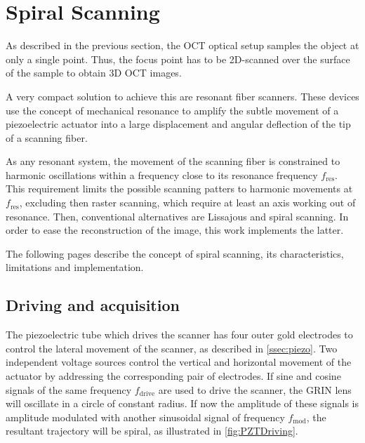 \documentclass[10pt]{iopart}
\begin{document}
\section{Spiral Scanning}


As described in the previous section, the OCT optical setup samples the object at only a single point. Thus, the focus point has to be 2D-scanned over the surface of the sample to obtain 3D OCT images.

A very compact solution to achieve this are resonant fiber scanners. These devices use the concept of mechanical resonance to amplify the subtle movement of a piezoelectric actuator into a large displacement and angular deflection of the tip of a scanning fiber. 

As any resonant system, the movement of the scanning fiber is constrained to harmonic oscillations within a frequency close to its resonance frequency $f_\mathrm{res}$. This requirement limits the possible scanning patters to harmonic movements at $f_\mathrm{res}$, excluding then raster scanning, which require at least an axis working out of resonance. Then, conventional alternatives are Lissajous \cite{Moon2010} and spiral scanning. In order to ease the reconstruction of the image, this work implements the latter.

The following pages describe the concept of spiral scanning, its characteristics, limitations and implementation.

\subsection*{Driving and acquisition}
The piezoelectric tube which drives the scanner has four outer gold electrodes to control the lateral movement of the scanner, as described in \autoref{ssec:piezo}. Two independent voltage sources control the vertical and horizontal movement of the actuator by addressing the corresponding pair of electrodes. If sine and cosine signals of the same frequency $f_\mathrm{drive}$ are used to drive the scanner, the GRIN lens will oscillate in a circle of constant radius. If now the amplitude of these signals is amplitude modulated with another sinusoidal signal of frequency $f_\mathrm{mod}$, the resultant trajectory will be spiral, as illustrated in \autoref{fig:PZTDriving}.
\end{document}
